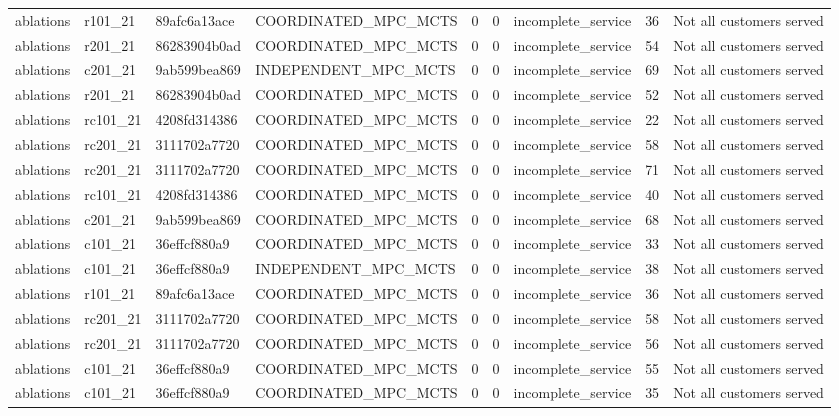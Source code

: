\begin{table}
{\begin{tabular}{llllrrlrl}
ablations & r101\_21 & 89afc6a13ace & COORDINATED\_MPC\_MCTS & 0 & 0 & incomplete\_service & 36 & Not all customers served \\
ablations & r201\_21 & 86283904b0ad & COORDINATED\_MPC\_MCTS & 0 & 0 & incomplete\_service & 54 & Not all customers served \\
ablations & c201\_21 & 9ab599bea869 & INDEPENDENT\_MPC\_MCTS & 0 & 0 & incomplete\_service & 69 & Not all customers served \\
ablations & r201\_21 & 86283904b0ad & COORDINATED\_MPC\_MCTS & 0 & 0 & incomplete\_service & 52 & Not all customers served \\
ablations & rc101\_21 & 4208fd314386 & COORDINATED\_MPC\_MCTS & 0 & 0 & incomplete\_service & 22 & Not all customers served \\
ablations & rc201\_21 & 3111702a7720 & COORDINATED\_MPC\_MCTS & 0 & 0 & incomplete\_service & 58 & Not all customers served \\
ablations & rc201\_21 & 3111702a7720 & COORDINATED\_MPC\_MCTS & 0 & 0 & incomplete\_service & 71 & Not all customers served \\
ablations & rc101\_21 & 4208fd314386 & COORDINATED\_MPC\_MCTS & 0 & 0 & incomplete\_service & 40 & Not all customers served \\
ablations & c201\_21 & 9ab599bea869 & COORDINATED\_MPC\_MCTS & 0 & 0 & incomplete\_service & 68 & Not all customers served \\
ablations & c101\_21 & 36effcf880a9 & COORDINATED\_MPC\_MCTS & 0 & 0 & incomplete\_service & 33 & Not all customers served \\
ablations & c101\_21 & 36effcf880a9 & INDEPENDENT\_MPC\_MCTS & 0 & 0 & incomplete\_service & 38 & Not all customers served \\
ablations & r101\_21 & 89afc6a13ace & COORDINATED\_MPC\_MCTS & 0 & 0 & incomplete\_service & 36 & Not all customers served \\
ablations & rc201\_21 & 3111702a7720 & COORDINATED\_MPC\_MCTS & 0 & 0 & incomplete\_service & 58 & Not all customers served \\
ablations & rc201\_21 & 3111702a7720 & COORDINATED\_MPC\_MCTS & 0 & 0 & incomplete\_service & 56 & Not all customers served \\
ablations & c101\_21 & 36effcf880a9 & COORDINATED\_MPC\_MCTS & 0 & 0 & incomplete\_service & 55 & Not all customers served \\
ablations & c101\_21 & 36effcf880a9 & COORDINATED\_MPC\_MCTS & 0 & 0 & incomplete\_service & 35 & Not all customers served \\

\end{tabular}}
\end{table}
